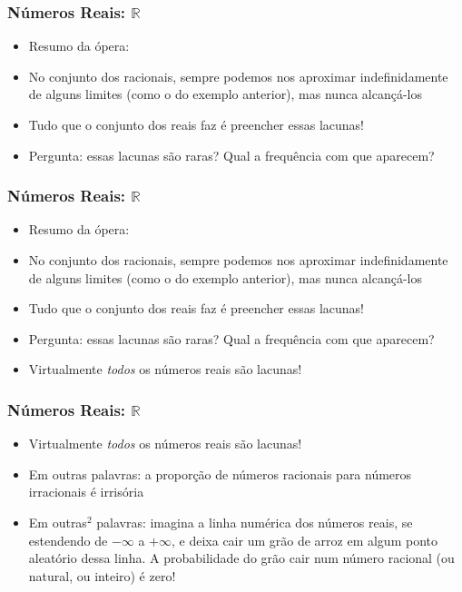 \documentclass[usenames,dvipsnames,svgnames]{beamer}
\begin{document}
\begin{frame}
	
	\frametitle{Números Reais: $\mathbb{R}$}

	\begin{itemize}
		\item Resumo da ópera:
		\item No conjunto dos racionais, sempre podemos nos aproximar indefinidamente de alguns limites (como o do exemplo anterior), mas nunca alcançá-los
		\item Tudo que o conjunto dos reais faz é preencher essas lacunas!
		\item Pergunta: essas lacunas são raras? Qual a frequência com que aparecem?
	\end{itemize}

\end{frame}

\begin{frame}
	
	\frametitle{Números Reais: $\mathbb{R}$}

	\begin{itemize}
		\item Resumo da ópera:
		\item No conjunto dos racionais, sempre podemos nos aproximar indefinidamente de alguns limites (como o do exemplo anterior), mas nunca alcançá-los
		\item Tudo que o conjunto dos reais faz é preencher essas lacunas!
		\item Pergunta: essas lacunas são raras? Qual a frequência com que aparecem?
		\item {\color{red} Virtualmente \emph{todos} os números reais são lacunas!}
	\end{itemize}

\end{frame}

\begin{frame}
	
	\frametitle{Números Reais: $\mathbb{R}$}

	\begin{itemize}
		\item Virtualmente \emph{todos} os números reais são lacunas!
		\item Em outras palavras: a proporção de números racionais para números irracionais é irrisória
		\item Em outras$^2$ palavras: imagina a linha numérica dos números reais, se estendendo de $-\infty$ a $+\infty$, e deixa cair um grão de arroz em algum ponto aleatório dessa linha. A probabilidade do grão cair num número racional (ou natural, ou inteiro) é zero!
	\end{itemize}

\end{frame}
\end{document}
